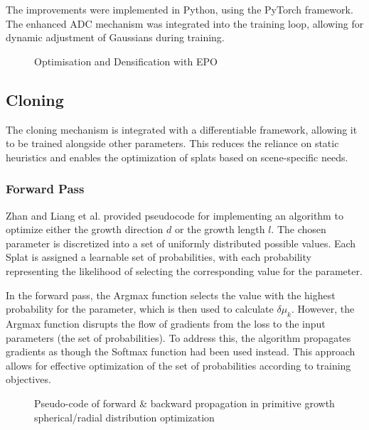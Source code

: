 \documentclass[11pt]{report}
\begin{document}
The improvements were implemented in Python, using the PyTorch framework. The enhanced ADC mechanism was integrated into the training loop, allowing for dynamic adjustment of Gaussians during training.

\begin{figure}[ht]
    \centering
    \begin{minipage}{0.75\textwidth}
        \begin{algorithm}[H]
            
            \caption{Optimisation and Densification with EPO}
            \label{alg:our_algorithm} 
        \end{algorithm}
    \end{minipage}
\end{figure}

\subsection{Cloning}

The cloning mechanism is integrated with a differentiable framework, allowing it to be trained alongside other parameters. This reduces the reliance on static heuristics and enables the optimization of splats based on scene-specific needs.

\subsubsection{Forward Pass}
Zhan and Liang et al. provided pseudocode for implementing an algorithm to optimize either the growth direction $d$ or the growth length $l$. The chosen parameter is discretized into a set of uniformly distributed possible values. Each Splat is assigned a learnable set of probabilities, with each probability representing the likelihood of selecting the corresponding value for the parameter.

In the forward pass, the Argmax function selects the value with the highest probability for the parameter, which is then used to calculate $\delta \mu_k$. However, the Argmax function disrupts the flow of gradients from the loss to the input parameters (the set of probabilities). To address this, the algorithm propagates gradients as though the Softmax function had been used instead. This approach allows for effective optimization of the set of probabilities according to training objectives.

\begin{figure}[ht] %
    \centering
    \begin{minipage}{0.70\textwidth}
        \begin{algorithm}[H]
        
        \caption{Pseudo-code of forward \& backward propagation in primitive growth spherical/radial distribution optimization}
        \label{alg:clone_algo}
        \end{algorithm}
    \end{minipage}
\end{figure}
\end{document}
